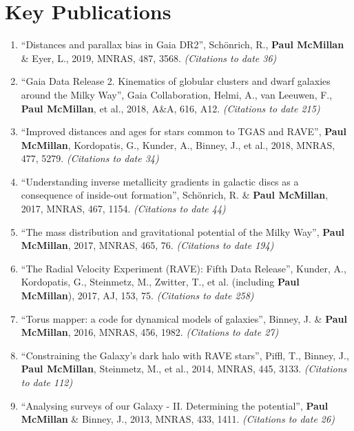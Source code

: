 \documentclass{resume}
\begin{document}
\section*{Key Publications}

\begin{enumerate}
\item ``Distances and parallax bias in Gaia DR2'', Sch\"onrich, R., \textbf{Paul McMillan} \& Eyer, L., 2019, MNRAS, 487, 3568. \textit{(Citations to date 36)}

\item ``Gaia Data Release 2. Kinematics of globular clusters and dwarf galaxies around the Milky Way'', Gaia Collaboration, Helmi, A., van Leeuwen, F., \textbf{Paul McMillan}, et al., 2018, A\&A, 616, A12. \textit{(Citations to date 215)}

\item ``Improved distances and ages for stars common to TGAS and RAVE'', \textbf{Paul McMillan}, Kordopatis, G., Kunder, A., Binney, J., et al., 2018, MNRAS, 477, 5279. \textit{(Citations to date 34)}

\item ``Understanding inverse metallicity gradients in galactic discs as a consequence of inside-out formation'', Sch\"onrich, R. \& \textbf{Paul McMillan}, 2017, MNRAS, 467, 1154. \textit{(Citations to date 44)}

\item ``The mass distribution and gravitational potential of the Milky Way'', \textbf{Paul McMillan}, 2017, MNRAS, 465, 76. \textit{(Citations to date 194)}

\item ``The Radial Velocity Experiment (RAVE): Fifth Data Release'', Kunder, A., Kordopatis, G., Steinmetz, M., Zwitter, T., et al. (including \textbf{Paul McMillan}), 2017, AJ, 153, 75. \textit{(Citations to date 258)}

\item ``Torus mapper: a code for dynamical models of galaxies'', Binney, J. \& \textbf{Paul McMillan}, 2016, MNRAS, 456, 1982. \textit{(Citations to date 27)}

\item ``Constraining the Galaxy's dark halo with RAVE stars'', Piffl, T., Binney, J., \textbf{Paul McMillan}, Steinmetz, M., et al., 2014, MNRAS, 445, 3133. \textit{(Citations to date 112)}

\item ``Analysing surveys of our Galaxy - II. Determining the potential'', \textbf{Paul McMillan} \& Binney, J., 2013, MNRAS, 433, 1411. \textit{(Citations to date 26)}


\end{enumerate}
\end{document}
